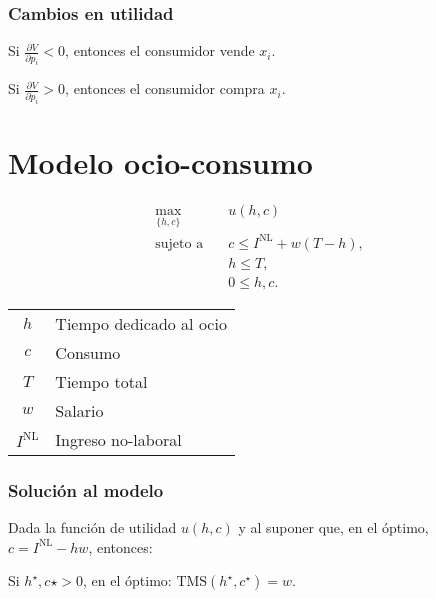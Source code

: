 \documentclass[8pt,a4paper]{extarticle}
\begin{document}
\begin{multicols}{3}
\subsubsection*{Cambios en utilidad}

\begin{eqlist}
\item Si $\displaystyle \frac{\partial V}{\partial p_i} < 0$, entonces el consumidor vende $x_i$.
\item Si $\displaystyle \frac{\partial V}{\partial p_i} > 0$, entonces el consumidor compra $x_i$.
\end{eqlist}

\newpage

\section{Modelo ocio-consumo}

\begin{equation*}
\begin{aligned}
	\max_{\{h, c\}}\	  & u(h, c) \\
	\text{sujeto a} \quad & c \le I^{\text{NL}} + w(T - h), \\
						  & h \le T, \\
						  & 0 \le h, c.
\end{aligned}
\end{equation*}

\begin{center}
\begin{tabular}{ c l }
	\hline
	$h$ & Tiempo dedicado al ocio \\
	$c$ & Consumo \\
	$T$ & Tiempo total \\
	$w$ & Salario \\
	$I^{\text{NL}}$ & Ingreso no-laboral \\
	\hline
\end{tabular}
\end{center}

\subsubsection*{Solución al modelo}

Dada la función de utilidad $u (h, c)$ y al suponer que, en el óptimo, $c = I^{\text{NL}} - hw$, entonces:

\begin{bulletlist}
\item Si $h^\star, c\star > 0$, en el óptimo: $\text{TMS} (h^\star, c^\star) = w$.
\end{bulletlist}


\end{multicols}
\end{document}
